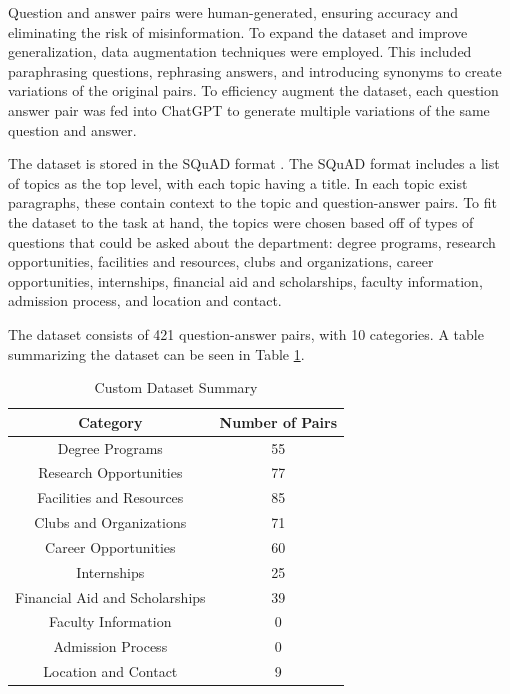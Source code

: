 \documentclass[conference]{IEEEtran}
\begin{document}
Question and answer pairs were human-generated, ensuring accuracy and eliminating the risk of misinformation.
To expand the dataset and improve generalization, data augmentation techniques were employed.
This included paraphrasing questions, rephrasing answers, and introducing synonyms to create variations of the original pairs.
To efficiency augment the dataset, each question answer pair was fed into ChatGPT to generate multiple variations of the same question and answer.

The dataset is stored in the SQuAD format \cite{b7}. 
The SQuAD format includes a list of topics as the top level, with each topic having a title. 
In each topic exist paragraphs, these contain context to the topic and question-answer pairs.
To fit the dataset to the task at hand, the topics were chosen based off of types of questions that could be asked about the department:
degree programs, research opportunities, facilities and resources, clubs and organizations, career opportunities, internships, financial aid and scholarships, faculty information, admission process, and location and contact.

The dataset consists of 421 question-answer pairs, with 10 categories.
A table summarizing the dataset can be seen in Table \ref{tab:dataset}.
\begin{table}[h]
    \centering
    \caption{Custom Dataset Summary}
    \begin{tabular}{|c|c|}
        \hline
        \textbf{Category} & \textbf{Number of Pairs} \\ \hline
        Degree Programs & 55 \\ \hline
        Research Opportunities & 77 \\ \hline
        Facilities and Resources & 85 \\ \hline
        Clubs and Organizations & 71 \\ \hline
        Career Opportunities & 60 \\ \hline
        Internships & 25 \\ \hline
        Financial Aid and Scholarships & 39 \\ \hline
        Faculty Information & 0 \\ \hline
        Admission Process & 0 \\ \hline
        Location and Contact & 9 \\ \hline
    \end{tabular}
    \label{tab:dataset}
\end{table}
\end{document}
